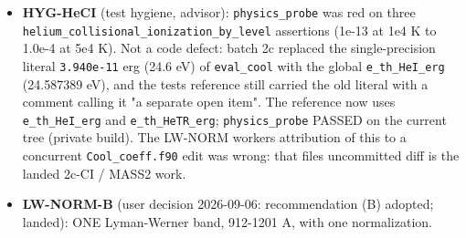 \documentclass[english,a4paper]{my_memo}
\begin{document}
\begin{itemize}
  \texttt{fuv\_band\_ledger/run.sh} comment. Advisor follow-up: the table\textquotesingle s generator
  inputs (nine \texttt{abs\_T\#\#\#\#.npz}, 27 CLOUDY rate files, the line-by-line
  scripts, the Meudon level and line data, 29 MB) moved from the 2026-09-03
  scratch directory into \texttt{src/utils/h2\_shielding\_lbl/} with a README, and
  \texttt{h2\_shielding\_table\_line\_by\_line.py}\textquotesingle s template brought in line with the
  hand-renamed \texttt{axis} dummy of \texttt{h2\_shield\_locate}: the generator now
  reproduces the shipped module BYTE FOR BYTE (MEASURED). The repair, table
  on 912-1110 A or beam widened to 912-1200 A with the B1 flux joined, is
  item 6 of \texttt{To\_be\_determined\_by\_user\_20260906.md} (recommendation: widen),
  because the second redefines the \texttt{Stellar\ LW\ flux} key. Still to correct
  after B3c releases \texttt{write\_output.f90}: the ledger\textquotesingle s LW label says "two
  fits" and should say "two bands" (with the \texttt{header\_names\_lw\_fits}
  assertion of \texttt{fuv\_band\_ledger}).
\item
  \textbf{HYG-HeCI} (test hygiene, advisor): \texttt{physics\_probe} was red on three
  \texttt{helium\_collisional\_ionization\_by\_level} assertions (1e-13 at 1e4 K to
  1.0e-4 at 5e4 K). Not a code defect: batch 2c replaced the single-precision
  literal \texttt{3.940e-11} erg (24.6 eV) of \texttt{eval\_cool} with the global
  \texttt{e\_th\_HeI\_erg} (24.587389 eV), and the test\textquotesingle s reference still carried the
  old literal with a comment calling it "a separate open item". The reference
  now uses \texttt{e\_th\_HeI\_erg} and \texttt{e\_th\_HeTR\_erg}; \texttt{physics\_probe} PASSED on the
  current tree (private build). The LW-NORM worker\textquotesingle s attribution of this to
  a concurrent \texttt{Cool\_coeff.f90} edit was wrong: that file\textquotesingle s uncommitted diff
  is the landed 2c-CI / MASS2 work.
\item
  \textbf{LW-NORM-B} (user decision 2026-09-06: recommendation (B) adopted;
  landed): ONE Lyman-Werner band, 912-1201 A, with one normalization.


\end{itemize}
\end{document}
